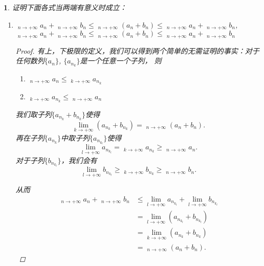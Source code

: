 \documentclass[utf8]{book}
\newtheorem{example}{}[section]             %
\DeclareMathOperator*\lowlim{\underline{lim}}
\DeclareMathOperator*\uplim{\overline{lim}}
\begin{document}
\begin{example}
证明下面各式当两端有意义时成立：
\renewcommand\labelenumi{\normalfont(\theenumi)}
\begin{enumerate}
\item $\displaystyle\lowlim_{n\to +\infty}a_n + \displaystyle\lowlim_{n\to +\infty}b_n \leq \displaystyle\lowlim_{n\to +\infty}(a_n + b_n) \leq \displaystyle\lowlim_{n\to +\infty}a_n + \displaystyle\uplim_{n\to +\infty}b_n$,\\
$\displaystyle\lowlim_{n\to +\infty}a_n + \displaystyle\uplim_{n\to +\infty}b_n \leq \displaystyle\uplim_{n\to +\infty}(a_n + b_n) \leq \displaystyle\uplim_{n\to +\infty}a_n + \displaystyle\uplim_{n\to +\infty}b_n$
\begin{proof}
有上，下极限的定义，我们可以得到两个简单的无需证明的事实：对于任何数列$\{a_n\}$, 
$\{a_{n_k}\}$是一个任意一个子列， 则
\renewcommand\labelenumi{\normalfont(\theenumi)}
\begin{enumerate}
\item $\displaystyle\lowlim_{n\to +\infty}a_n \leq \displaystyle\lowlim_{k\to +\infty}a_{n_k}$
\item $\displaystyle\uplim_{k\to +\infty}a_{n_k} \leq \displaystyle\uplim_{n\to +\infty}a_n$
\end{enumerate}
我们取子列$\{a_{n_k} + b_{n_k}\}$使得
$$\displaystyle\lim_{k\to +\infty}(a_{n_k} + b_{n_k}) = \displaystyle\lowlim_{n\to +\infty}(a_n + b_n).$$
再在子列$\{a_{n_k}\}$中取子列$\{a_{n_{k_l}}\}$使得
$$\displaystyle\lim_{l\to +\infty}a_{n_{k_l}} = \displaystyle\lowlim_{k\to +\infty}a_{n_k}\geq \displaystyle\lowlim_{n\to +\infty}a_n.$$
对于子列$\{b_{n_{k_l}}\}$，我们会有
$$\displaystyle\lim_{l\to +\infty}b_{n_{k_l}} \geq \displaystyle\lowlim_{k\to +\infty}b_{n_k}\geq \displaystyle\lowlim_{n\to +\infty}b_n.$$

从而
\begin{equation*}
\begin{split}
\displaystyle\lowlim_{n\to +\infty}a_n+\displaystyle\lowlim_{n\to +\infty}b_n &\leq \displaystyle\lim_{l\to +\infty}a_{n_{k_l}} + \displaystyle\lim_{l\to +\infty}b_{n_{k_l}} \\&= \displaystyle\lim_{l\to +\infty}(a_{n_{k_l}}+b_{n_{k_l}}) \\&= \displaystyle\lim_{k\to +\infty}(a_{n_k} + b_{n_k})  \\&= \displaystyle\lowlim_{n\to +\infty}(a_n + b_n).
\end{split}
\end{equation*}


\end{proof}
\end{enumerate}
\end{example}
\end{document}
